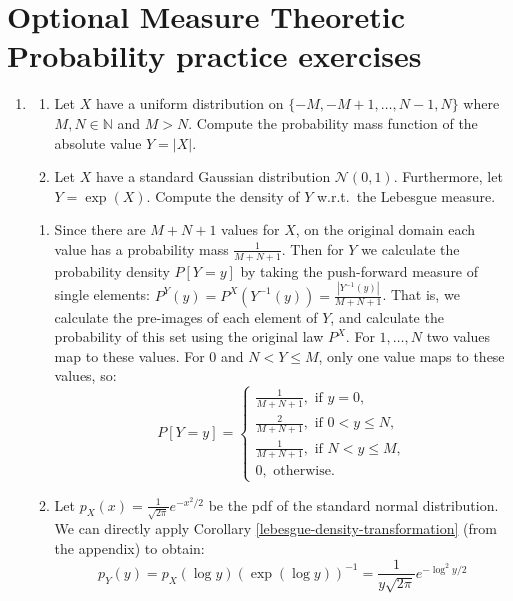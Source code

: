\section*{Optional Measure Theoretic Probability practice exercises}
\begin{enumerate}[resume*]
    \item %
    \begin{enumerate}
        \item Let $X$ have a uniform distribution on $\{-M, -M+1, \dots, N-1, N\}$ where $M,N \in \mathbb{N}$ and $M>N$. Compute the probability mass function of the absolute value $Y=|X|$.
        \item Let $X$ have a standard Gaussian distribution $\mathcal{N}(0,1)$. Furthermore, let $Y = \exp (X)$. Compute the density of $Y$ w.r.t.\ the Lebesgue measure.
    \end{enumerate}
    \begin{ungradedsolution}
        \begin{enumerate}
            \item Since there are $M+N+1$ values for $X$, on the original domain each value has a probability mass $\frac{1}{M+N+1}$. Then for $Y$ we calculate the probability density $P[Y=y]$ by taking the push-forward measure of single elements: $P^Y(y) = P^X(Y^{-1}(y)) = \frac{|Y^{-1}(y)|}{M+N+1}$. That is, we calculate the pre-images of each element of $Y$, and calculate the probability of this set using the original law $P^X$. For $1, \dots, N$ two values map to these values. For $0$ and $N < Y \leq M$, only one value maps to these values, so:
            \begin{equation*}
                P[Y=y] = \begin{cases}
                    \frac{1}{M+N+1}, \text{ if } y = 0,        \\
                    \frac{2}{M+N+1}, \text{ if } 0 < y \leq N, \\
                    \frac{1}{M+N+1}, \text{ if } N < y \leq M, \\
                    0, \text{ otherwise.}
                \end{cases}
            \end{equation*}
            \item Let $p_X(x)=\frac{1}{\sqrt{2\pi}} e^{-x^2/2}$ be the pdf of the standard normal distribution. We can directly apply Corollary \ref*{lebesgue-density-transformation} (from the appendix) to obtain:
            \begin{equation*}
                p_Y(y) = p_X(\log y) (\exp(\log y))^{-1} = \frac{1}{y\sqrt{2\pi}} e^{-\log^2 y/2}
            \end{equation*}
        \end{enumerate}
    \end{ungradedsolution}


\end{enumerate}
